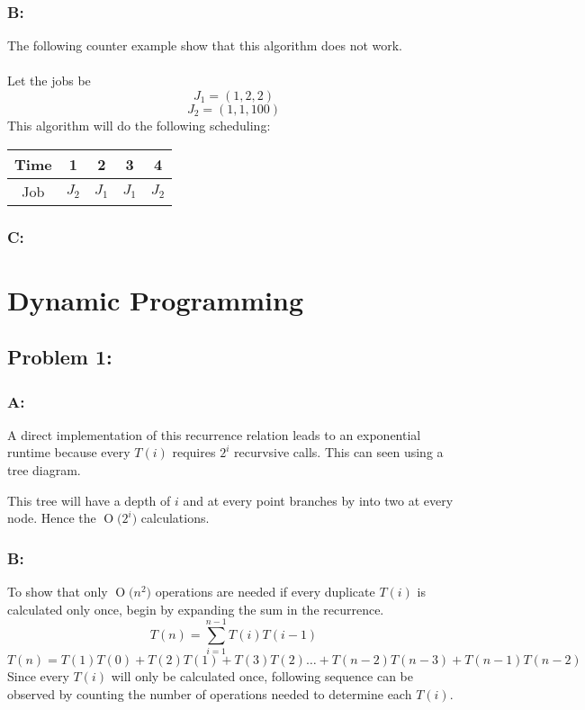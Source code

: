 \documentclass[12pt]{article}
\newcommand{\BigO}[1]{\ensuremath{\operatorname{O}\bigl(#1\bigr)}}
\begin{document}
\subsubsection*{B:}
The following counter example show that this algorithm does not work.\\\\
Let the jobs be
\[
J_1=(1,2,2)
\]
\[
J_2=(1,1,100)
\]
This algorithm will do the following scheduling:\\
\begin{center}
    \begin{tabular}{c|c|c|c|c}
    Time & 1 & 2 & 3 & 4 \\ \hline
    Job & $J_2$ & $J_1$ & $J_1$ & $J_2$ \\
    \end{tabular}
\end{center}

\subsubsection*{C:}


\section*{Dynamic Programming}
\subsection*{Problem 1:}
\subsubsection*{A:}
A direct implementation of this recurrence relation leads to an exponential
runtime because every $T(i)$ requires $2^{i}$ recurvsive calls.  This can
seen using a tree diagram.\\ 
\begin{center}
\end{center}    
This tree will have a depth of $i$ and at every point branches by into 
two at every node.  Hence the \BigO{2^{i}} calculations. 

\subsubsection*{B:}
To show that only \BigO{n^2} operations are needed if every duplicate
$T(i)$ is calculated only once, begin by expanding the sum in the 
recurrence.
\[
T(n) = \sum_{i=1}^{n-1}T(i)T(i-1)
\]
\[ 
T(n) = T(1)T(0) + T(2)T(1) + T(3)T(2)\dots
+ T(n-2)T(n-3) + T(n-1)T(n-2)
\]
Since every $T(i)$ will only be calculated once, following sequence
can be observed by counting the number of operations needed to determine
each $T(i)$.
\end{document}
